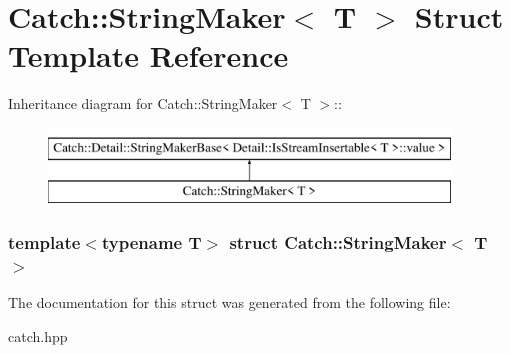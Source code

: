 \hypertarget{structCatch_1_1StringMaker}{
\section{Catch::StringMaker$<$ T $>$ Struct Template Reference}
\label{structCatch_1_1StringMaker}
}
Inheritance diagram for Catch::StringMaker$<$ T $>$::\begin{figure}[H]
\begin{center}
\leavevmode
\includegraphics[height=2cm]{structCatch_1_1StringMaker}
\end{center}
\end{figure}
\subsubsection*{template$<$typename T$>$ struct Catch::StringMaker$<$ T $>$}



The documentation for this struct was generated from the following file:\begin{DoxyCompactItemize}
\item 
catch.hpp\end{DoxyCompactItemize}
